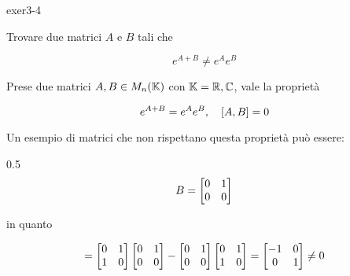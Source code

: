 {exer3-4}
{
Trovare due matrici $ A $ e $ B $ tali che

\begin{equation}
	e^{A+B} \neq e^{A} e^{B}
\end{equation}
}
{
Prese due matrici $ A,B \in M_{n}(\mathbb{K}) $ con $ \mathbb{K} = \mathbb{R}, \mathbb{C} $, vale la proprietà

\begin{equation}
	e^{A+B} = e^{A} e^{B} \qcomma [A,B] = 0
\end{equation}

Un esempio di matrici che non rispettano questa proprietà può essere:

	{0.5}{%
			\begin{equation}
				B = \bmqty{ %
							0 & 1 \\
							0 & 0 %
							}
			\end{equation}
			}

in quanto

\begin{equation}
	[A,B] = %
	\bmqty{ 0 & 1 \\ 1 & 0 } \bmqty{ 0 & 1 \\ 0 & 0 } - \bmqty{ 0 & 1 \\ 0 & 0 }  \bmqty{ 0 & 1 \\ 1 & 0 } %
	= \bmqty{ -1 & 0 \\ 0 & 1 } %
	\neq 0
\end{equation}
}


